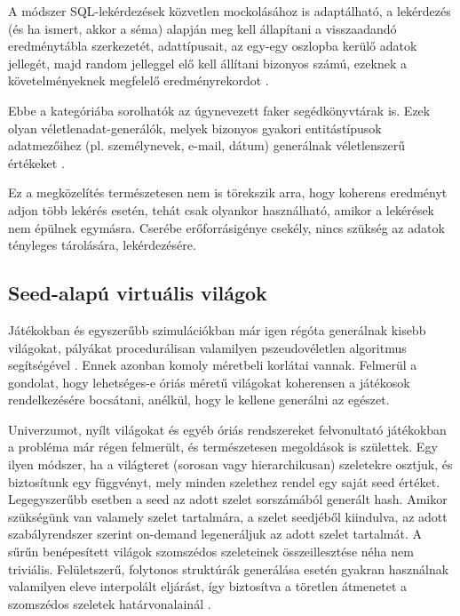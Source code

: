 \documentclass[
    parspace,
    noindent,
    nohyp,
]{elteiktdk}[2023/04/10]
\begin{document}
A módszer SQL-lekérdezések közvetlen mockolásához is adaptálható,
a lekérdezés (és ha ismert, akkor a séma) alapján meg kell állapítani
a visszaadandó eredménytábla szerkezetét, adattípusait,
az egy-egy oszlopba kerülő adatok jellegét,
majd random jelleggel elő kell állítani bizonyos számú, ezeknek a követelményeknek megfelelő eredményrekordot%
\cite{SoftwareGoSqlMock}.

Ebbe a kategóriába sorolhatók az úgynevezett faker segédkönyvtárak is.
Ezek olyan véletlenadat-generálók,
melyek bizonyos gyakori entitástípusok adatmezőihez (pl. személynevek, e-mail, dátum)
generálnak véletlenszerű értékeket%
\cite{SoftwareRubyFaker,SoftwareJavaFaker}.

Ez a megközelítés természetesen nem is törekszik arra,
hogy koherens eredményt adjon több lekérés esetén,
tehát csak olyankor használható, amikor a lekérések nem épülnek egymásra.
Cserébe erőforrásigénye csekély, nincs szükség az adatok tényleges tárolására, lekérdezésére.

\subsection{Seed-alapú virtuális világok}

Játékokban és egyszerűbb szimulációkban már igen régóta generálnak kisebb világokat,
pályákat procedurálisan valamilyen pszeudovéletlen algoritmus segítségével%
\cite{Smith2015AnalogHistoryProcedural}.
Ennek azonban komoly méretbeli korlátai vannak.
Felmerül a gondolat, hogy lehetséges-e óriás méretű világokat koherensen
a játékosok rendelkezésére bocsátani, anélkül, hogy le kellene generálni az egészet.

Univerzumot, nyílt világokat és egyéb óriás rendszereket felvonultató játékokban
a probléma már régen felmerült, és természetesen megoldások is születtek.
Egy ilyen módszer, ha a világteret (sorosan vagy hierarchikusan)
szeletekre osztjuk, és biztosítunk egy függvényt,
mely minden szelethez rendel egy saját seed értéket.
Legegyszerűbb esetben a seed az adott szelet sorszámából generált hash.
Amikor szükségünk van valamely szelet tartalmára, a szelet seedjéből kiindulva,
az adott szabályrendszer szerint on-demand legeneráljuk az adott szelet tartalmát.
A sűrűn benépesített világok szomszédos szeleteinek összeillesztése néha nem triviális.
Felületszerű, folytonos struktúrák generálása esetén gyakran használnak
valamilyen eleve interpolált eljárást,
így biztosítva a töretlen átmenetet a szomszédos szeletek határvonalainál%
\cite{Perlin1985Image,Parberry2014Designer,Krecklau2011Procedural}.
\end{document}
